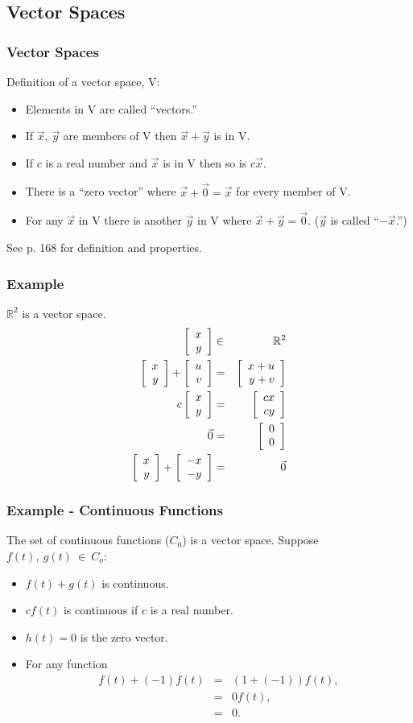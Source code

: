 \subsection{Vector Spaces}

\begin{frame}
  \frametitle{Vector Spaces}

  Definition of a vector space, V:
  \begin{itemize}
  \item Elements in V are called ``vectors.''
  \item If $\vec{x}$, $\vec{y}$ are members of V then
    $\vec{x}+\vec{y}$ is in V.
  \item If $c$ is a real number and $\vec{x}$ is in V then so is
    $c\vec{x}$.
  \item There is a ``zero vector'' where $\vec{x}+\vec{0}=\vec{x}$ for
    every member of V.
  \item For any $\vec{x}$ in V there is another $\vec{y}$ in V where
    $\vec{x}+\vec{y}=\vec{0}$. ($\vec{y}$ is called ``$-\vec{x}$.'')
  \end{itemize}

  See p. 168 for definition and properties.

\end{frame}

\begin{frame}
  \frametitle{Example}

  $\mathbb{R}^2$ is a vector space.
  \begin{eqnarray*}
    \left[ \begin{array}{r} x \\ y \end{array} \right] & \in & \mathbb{R}^2 \\
    \left[ \begin{array}{r} x \\ y \end{array} \right] + \left[ \begin{array}{r} u \\ v \end{array} \right] & = & \left[ \begin{array}{r} x+u \\ y+v \end{array} \right] \\
    c \left[ \begin{array}{r} x \\ y \end{array} \right] & = & \left[ \begin{array}{r} cx \\ cy \end{array} \right] \\
    \vec{0} & = & \left[ \begin{array}{r} 0 \\ 0 \end{array} \right] \\
    \left[ \begin{array}{r} x \\ y \end{array} \right] + \left[ \begin{array}{r} -x \\ -y \end{array} \right] & = & \vec{0}
  \end{eqnarray*}

\end{frame}


\begin{frame}
  \frametitle{Example - Continuous Functions}

  The set of continuous functions ($C_0$) is a vector space.
  Suppose $f(t),~g(t)~\in~C_o$:
  \begin{itemize}
  \item $f(t)+g(t)$ is continuous.
  \item $c f(t)$ is continuous if $c$ is a real number.
  \item $h(t)=0$ is the zero vector.
  \item For any function
    \begin{eqnarray*}
      f(t) + (-1)f(t) & = & (1 + (-1))f(t), \\
      & = & 0 f(t), \\
      & = & 0.
    \end{eqnarray*}
  \end{itemize}

\end{frame}



